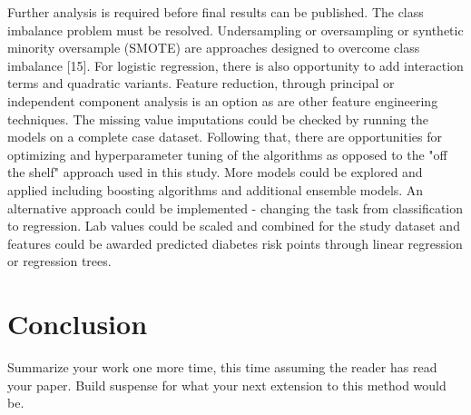 \documentclass[twoside,11pt]{article}
\begin{document}
Further analysis is required before final results can be published. The class imbalance problem must be resolved. Undersampling or oversampling or synthetic minority oversample (SMOTE) are approaches designed to overcome class imbalance [15]. For logistic regression, there is also opportunity to add interaction terms and quadratic variants. Feature reduction, through principal or independent component analysis is an option as are other feature engineering techniques. The missing value imputations could be checked by running the models on a complete case dataset. Following that, there are opportunities for optimizing and hyperparameter tuning of the algorithms as opposed to the "off the shelf" approach used in this study. More models could be explored and applied including boosting algorithms and additional ensemble models. An alternative approach could be implemented - changing the task from classification to regression. Lab values could be scaled and combined for the study dataset and features could be awarded predicted diabetes risk points through linear regression or regression trees. 

\section{Conclusion} 
Summarize your work one more time, this time assuming the reader has read your paper.
Build suspense for what your next extension to this method would be.

\end{document}
